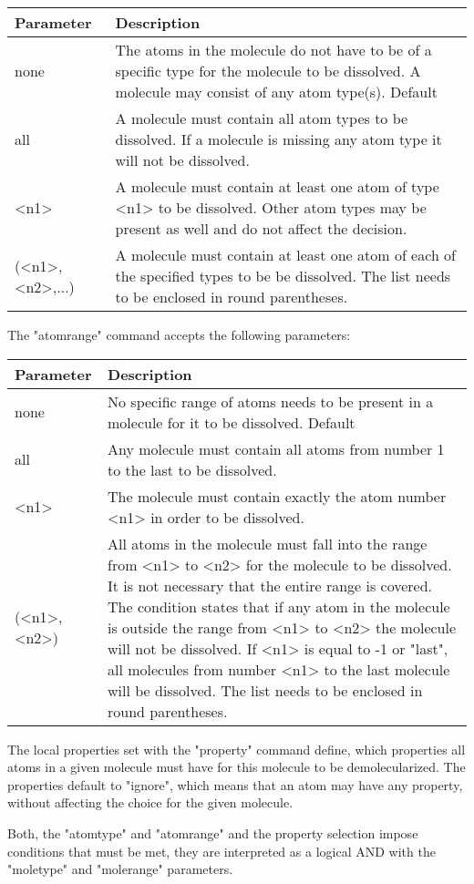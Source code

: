 \begin{tabularx}{\textwidth}{|p{30mm}|X|}
  \hline
  {\bf Parameter} & {\bf Description} \\
  \hline\hline
  none    & The atoms in the molecule do not have to be of a specific type for
            the molecule to be dissolved. A molecule may consist of any atom 
            type(s). Default\\
  all     & A molecule must contain all atom types to be dissolved. If a 
            molecule is missing any atom type it will not be dissolved. \\
  <n1>    & A molecule must contain at least one atom of type <n1> to be 
            dissolved. Other atom types may be present as well and do not affect
            the decision. \\
  (<n1>,<n2>{,...})    & A molecule must contain at least one atom of each of 
                         the specified types to be be dissolved. The list needs
                         to be enclosed in round parentheses.\\
  \hline
\end{tabularx}

The "atomrange" command accepts the following parameters:

\begin{tabularx}{\textwidth}{|p{30mm}|X|}
  \hline
  {\bf Parameter} & {\bf Description} \\
  \hline\hline
  none    & No specific range of atoms needs to be present in a molecule for 
            it to be dissolved. Default\\
  all     & Any molecule must contain all atoms from number 1 to the last to be 
            dissolved. \\
  <n1>    & The molecule must contain exactly the atom number <n1> in order to 
            be dissolved.\\
  (<n1>,<n2>)    & All atoms in the molecule must fall into the range from <n1> 
                   to <n2> for the molecule to be dissolved. It is not necessary
                   that the entire range is covered. The condition states that 
                   if any atom in the molecule is outside the range from <n1> 
                   to <n2> the molecule will not be dissolved. If <n1> is equal 
                   to -1 or "last", all molecules from number <n1> to the 
                   last molecule will be dissolved. The list needs to be 
                   enclosed in round parentheses.\\
  \hline
\end{tabularx}

The local properties set with the "property" command define, which properties 
all atoms in a given molecule must have for this molecule to be demolecularized.
The properties default to "ignore", which means that an atom may have any
property, without affecting the choice for the given molecule.

Both, the "atomtype" and "atomrange" and the property selection impose 
conditions that must be met, they
are interpreted as a logical AND with the "moletype" and "molerange" parameters.

